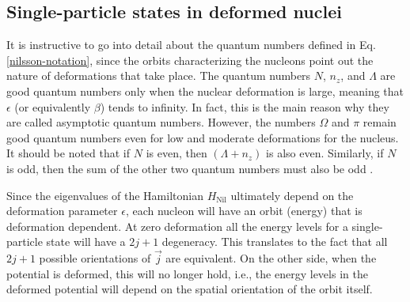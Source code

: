 \subsection{Single-particle states in deformed nuclei}

It is instructive to go into detail about the quantum numbers defined in Eq. \eqref{nilsson-notation}, since the orbits characterizing the nucleons point out the nature of deformations that take place. The quantum numbers $N$, $n_z$, and $\Lambda$ are good quantum numbers only when the nuclear deformation is large, meaning that $\epsilon$ (or equivalently $\beta$) tends to infinity. In fact, this is the main reason why they are called asymptotic quantum numbers. However, the numbers $\Omega$ and $\pi$ remain good quantum numbers even for low and moderate deformations for the nucleus. It should be noted that if $N$ is even, then $(\Lambda+n_z)$ is also even. Similarly, if $N$ is odd, then the sum of the other two quantum numbers must also be odd \cite{casten2000nuclear}.

Since the eigenvalues of the Hamiltonian $H_\text{Nil}$ ultimately depend on the deformation parameter $\epsilon$, each nucleon will have an orbit (energy) that is deformation dependent. At zero deformation all the energy levels for a single-particle state will have a $2j+1$ degeneracy. This translates to the fact that all $2j+1$ possible orientations of $\vec{j}$ are equivalent. On the other side, when the potential is deformed, this will no longer hold, i.e., the energy levels in the deformed potential will depend on the spatial orientation of the orbit itself.

